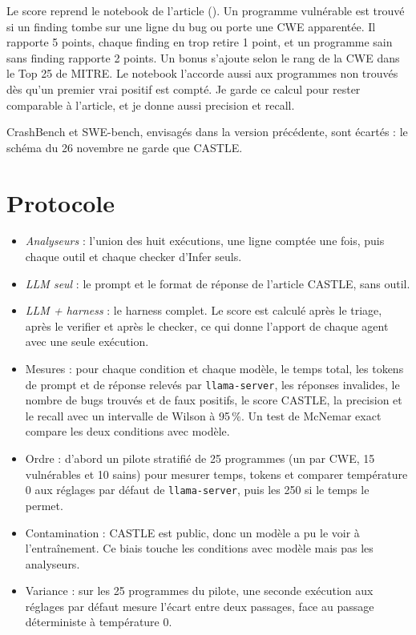 \documentclass[11pt,a4paper]{article}
\let\fichier\path
\begin{document}
Le score reprend le notebook de l'article (\fichier{harness/castle.py}). Un programme vulnérable est trouvé si un
finding tombe sur une ligne du bug ou porte une CWE apparentée. Il rapporte 5 points, chaque finding en trop
retire 1 point, et un programme sain sans finding rapporte 2 points. Un bonus s'ajoute selon le rang de la CWE
dans le Top 25 de MITRE. Le notebook l'accorde aussi aux programmes non trouvés dès qu'un premier vrai positif est
compté. Je garde ce calcul pour rester comparable à l'article, et je donne aussi precision et recall.

CrashBench et SWE-bench, envisagés dans la version précédente, sont écartés : le schéma du 26 novembre ne garde que CASTLE.

\section{Protocole}\label{sec:proto}

\begin{itemize}
  \item \emph{Analyseurs} : l'union des huit exécutions, une ligne comptée une fois, puis chaque outil et chaque
  checker d'Infer seuls.
  \item \emph{LLM seul} : le prompt et le format de réponse de l'article CASTLE, sans outil.
  \item \emph{LLM + harness} : le harness complet. Le score est calculé après le triage, après le verifier et
  après le checker, ce qui donne l'apport de chaque agent avec une seule exécution.
\end{itemize}

\begin{itemize}
  \item Mesures : pour chaque condition et chaque modèle, le temps total, les tokens de prompt et de réponse
  relevés par \texttt{llama-server}, les réponses invalides, le nombre de bugs trouvés et de faux positifs, le
  score CASTLE, la precision et le recall avec un intervalle de Wilson à 95\,\%. Un test de McNemar exact
  compare les deux conditions avec modèle.
  \item Ordre : d'abord un pilote stratifié de 25 programmes (un par CWE, 15 vulnérables et 10 sains) pour mesurer
  temps, tokens et comparer température 0 aux réglages par défaut de \texttt{llama-server}, puis les 250 si le
  temps le permet.
  \item Contamination : CASTLE est public, donc un modèle a pu le voir à l'entraînement. Ce biais touche les
  conditions avec modèle mais pas les analyseurs.
  \item Variance : sur les 25 programmes du pilote, une seconde exécution aux réglages par défaut mesure l'écart
  entre deux passages, face au passage déterministe à température 0.
\end{itemize}
\end{document}
